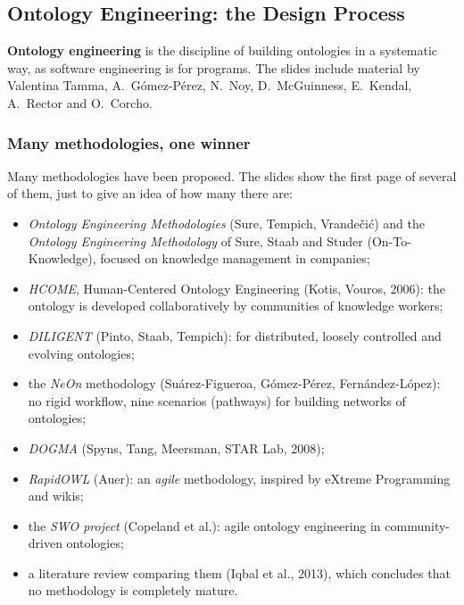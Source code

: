 \subsection{Ontology Engineering: the Design Process}
\label{sec:design-process}

\textbf{Ontology engineering} is the discipline of building ontologies in a systematic
way, as software engineering is for programs. The slides include material by Valentina
Tamma, A.\ Gómez-Pérez, N.\ Noy, D.\ McGuinness, E.\ Kendal, A.\ Rector and O.\ Corcho.

\subsubsection{Many methodologies, one winner}

Many methodologies have been proposed. The slides show the first page of several of
them, just to give an idea of how many there are:
\begin{itemize}[nosep]
  \item \emph{Ontology Engineering Methodologies} (Sure, Tempich, Vrandečić) and the
        \emph{Ontology Engineering Methodology} of Sure, Staab and Studer
        (On-To-Knowledge), focused on knowledge management in companies;
  \item \emph{HCOME}, Human-Centered Ontology Engineering (Kotis, Vouros, 2006): the
        ontology is developed collaboratively by communities of knowledge workers;
  \item \emph{DILIGENT} (Pinto, Staab, Tempich): for distributed, loosely controlled and
        evolving ontologies;
  \item the \emph{NeOn} methodology (Suárez-Figueroa, Gómez-Pérez, Fernández-López): no
        rigid workflow, nine scenarios (pathways) for building networks of ontologies;
  \item \emph{DOGMA} (Spyns, Tang, Meersman, STAR Lab, 2008);
  \item \emph{RapidOWL} (Auer): an \emph{agile} methodology, inspired by eXtreme
        Programming and wikis;
  \item the \emph{SWO project} (Copeland et al.): agile ontology engineering in
        community-driven ontologies;
  \item a literature review comparing them (Iqbal et al., 2013), which concludes that no
        methodology is completely mature.
\end{itemize}

